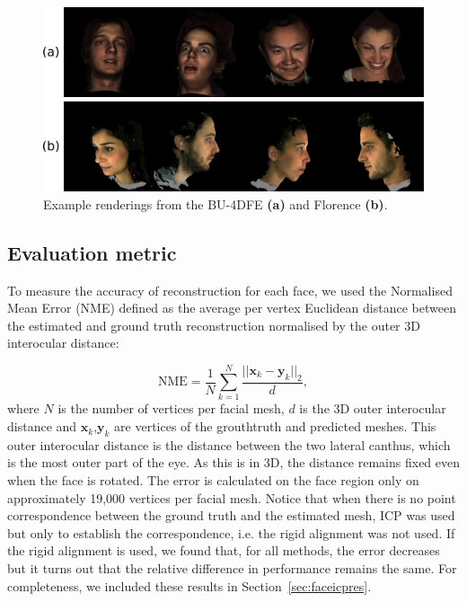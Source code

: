 \begin{figure}
  \centering
  \includegraphics[width=0.9\linewidth]{img/rendering_examples.pdf}
  \caption[Example BU-4DFE and Florence renderings]{Example renderings
    from the BU-4DFE \textbf{(a)} and Florence \textbf{(b)}.}
  \label{fig:example_renderings}
\end{figure}

\subsection{Evaluation metric} To measure the accuracy of reconstruction for
each face, we used the Normalised Mean Error (NME) defined as the
average per vertex Euclidean distance between the estimated and ground
truth reconstruction normalised by the outer 3D interocular distance:

\begin{equation}
  \textrm{NME} = \frac{1}{N} \sum_{k=1}^{N} \frac{||\mathbf{x}_k-\mathbf{y}_{k} ||_{2} }{d}, \label{eq:err}
\end{equation}
\label{eq:3d_nme}
where $N$ is the number of vertices per facial mesh, $d$ is the 3D
outer interocular distance and $\mathbf{x}_k$,$\mathbf{y}_k$ are
vertices of the grouthtruth and predicted meshes. This outer
interocular distance is the distance between the two lateral canthus,
which is the most outer part of the eye. As this is in 3D, the
distance remains fixed even when the face is rotated. The error is
calculated on the face region only on approximately 19,000 vertices
per facial mesh. Notice that when there is no point correspondence
between the ground truth and the estimated mesh, ICP was used but only
to establish the correspondence, i.e. the rigid alignment was not
used. If the rigid alignment is used, we found that, for all methods,
the error decreases but it turns out that the relative difference in
performance remains the same. For completeness, we included these
results in Section~\ref{sec:faceicpres}.


